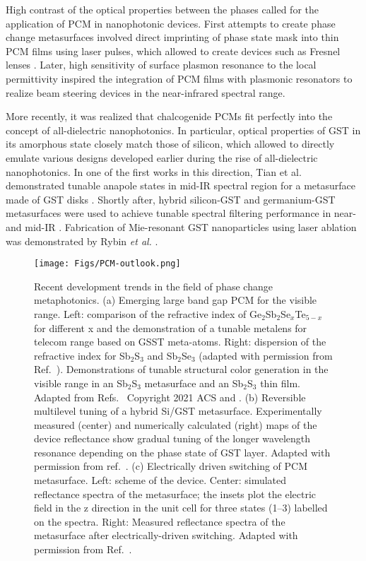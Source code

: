 \documentclass[journal=chreay,manuscript=review]{achemso}
\begin{document}
High contrast of the optical properties between the phases called for the application of PCM in nanophotonic devices. First attempts to create phase change metasurfaces involved direct imprinting of phase state mask into thin PCM films using laser pulses, which allowed to create devices such as Fresnel lenses \cite{wang2016optically}. Later, high sensitivity of surface plasmon resonance to the local permittivity inspired the integration of PCM films with plasmonic resonators \cite{galarreta2018nonvolatile} to realize beam steering devices in the near-infrared spectral range.

More recently, it was realized that chalcogenide PCMs fit perfectly into the concept of all-dielectric nanophotonics. In particular, optical properties of GST in its amorphous state closely match those of silicon, which allowed to directly emulate various designs developed earlier during the rise of all-dielectric nanophotonics. In one of the first works in this direction, Tian et al. demonstrated tunable anapole states in mid-IR spectral region for a metasurface made of GST disks \cite{Tian2019active}. Shortly after, hybrid silicon-GST and germanium-GST metasurfaces were used to achieve tunable spectral filtering performance  in near- and mid-IR \cite{leitis2020all,galarreta2020reconfigurable}. Fabrication of Mie-resonant GST nanoparticles using laser ablation was demonstrated by Rybin \textit{et al.} \cite{rybin2021optically}.


\begin{figure}
    \centering
    \texttt{[image: Figs/PCM-outlook.png]}
    \caption{
    Recent development trends in the field of phase change metaphotonics. (a) Emerging large band gap PCM for the visible range. Left: comparison of the refractive index of Ge$_2$Sb$_2$Se$_x$Te$_{5-x}$ for different x and the demonstration of a tunable metalens for telecom range based on GSST meta-atoms. Right: dispersion of the refractive index for Sb$_2$S$_3$ and Sb$_2$Se$_3$ (adapted with permission from Ref.~). Demonstrations of tunable structural color generation in the visible range in an Sb$_2$S$_3$ metasurface and an Sb$_2$S$_3$ thin film. Adapted from Refs.~ Copyright 2021 ACS and . (b) Reversible multilevel tuning of a hybrid Si/GST metasurface. Experimentally measured (center) and numerically calculated (right) maps of the device reflectance show gradual tuning of the longer wavelength resonance depending on the phase state of GST layer. Adapted with permission from ref.~. (c) Electrically driven switching of PCM metasurface. Left: scheme of the device. Center: simulated reflectance spectra of the metasurface; the insets plot the electric field in the z direction in the unit cell for three states (1–3) labelled on the spectra. Right: Measured reflectance spectra of the metasurface after electrically-driven switching. Adapted with permission from Ref.~.}
    \label{fig:PCM-outlook}
\end{figure}
\end{document}
